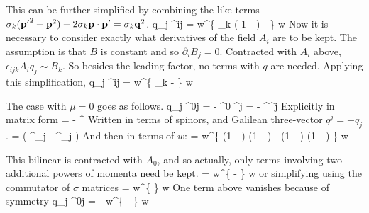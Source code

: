 This can be further simplified by combining the like terms $\sigma_k (\mathbf{p'}^2 + \mathbf{p}^2 ) - 2 \sigma_k \mathbf{p} \cdot \mathbf{p'} = \sigma_k \mathbf{q}^2$.
\beq
	\srb  {} q_j \sigma^{ij} \sr 
		=  w^\dagger \left \{
			\sigma_k \left( 1 -  \right ) -  
		\right \} w 
\eeq
Now it is necessary to consider exactly what derivatives of the field $A_i$ are to be kept.  The assumption is that $B$ is constant and so $\partial_i B_j = 0$.  Contracted with $A_i$ above, $\epsilon_{ijk} A_i q_j \sim B_k$.  So besides the leading factor, no terms with $q$ are needed.  Applying this simplification,
\beq \label{eq:Sh:Ti}
	\srb  {} q_j \sigma^{ij} \sr 
		=  w^\dagger \left \{
			\sigma_k -  
		\right \} w 
\eeq






The case with $\mu=0$ goes as follows.
\beq
	\srb  {} q_j \sigma^{0j} \sr
		=	 -  \srb \gamma^0 \gamma^j \sr 		
 		=  -  \sr^\dagger \gamma^j \sr
\eeq
Explicitly in matrix form 
\beq
	 = -  \sr^\dagger {} \sr 
\eeq
 Written in terms of spinors, and Galilean three-vector $q^j= -q_j$.
 \beq
 	=   \left( \eta^\dagger \sigma_j \chi - \chi^\dagger \sigma_j \eta \right )
 \eeq
 And then in terms of $w$:
\beq
	=    w^\dagger \left \{
		\left(1 -  \right )   \left(1 -  \right )
		- \left(1 -  \right )  \left(1 -  \right )
	\right \} w
\eeq

This bilinear is contracted with $A_0$, and so actually, only terms involving two additional powers of momenta need be kept.
\beq
	=    w^\dagger \left \{
		-   
	\right \} w
\eeq
or simplifying using the commutator of $\sigma$ matrices
\beq 
	=     w^\dagger \left \{
	\right \} w
\eeq
One term above vanishes because of symmetry
\beq \label{eq:Sh:T0}
\srb  {} q_j \sigma^{0j} \sr
	=  -  w^\dagger \left \{
			-  
	\right \} w
\eeq


